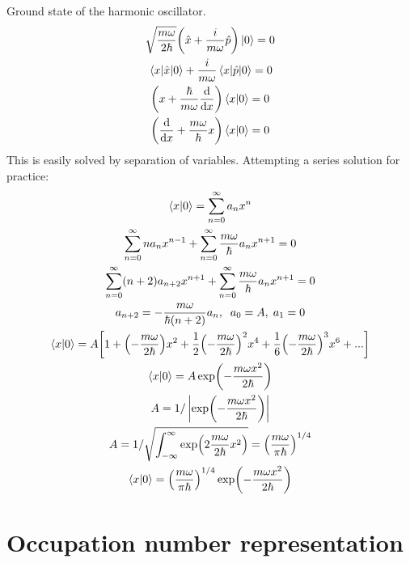 \documentclass{report}
\begin{document}
\begin{subquests}
	\item Ground state of the harmonic oscillator.
	\begin{gather*}
		\sqrt{\frac{m\omega}{2\hbar}}\pqty{\hat{x} + \frac{i}{m\omega}\hat{p}} \ket{0}= 0 \\
		\mel{x}{\hat{x}}{0} + \frac{i}{m\omega}\mel{x}{\hat{p}}{0} = 0 \\
		\pqty{x + \frac{\hbar}{m\omega}\dv{x}}\ip{x}{0} = 0 \\
		\pqty{\dv{x} + \frac{m\omega}{\hbar}x}\ip{x}{0} = 0 
	\end{gather*}
	This is easily solved by separation of variables. Attempting a series solution for practice:
	\begin{gather*}
		\ip{x}{0} = \sum_{n=0}^{\infty} a_n x^n \\
		\sum_{n=0}^{\infty}na_{n} x^{n-1} + \sum_{n=0}^{\infty}\frac{m\omega}{\hbar}a_{n}x^{n+1} = 0 \\
		\sum_{n=0}^{\infty}(n+2)a_{n+2} x^{n+1} + \sum_{n=0}^{\infty}\frac{m\omega}{\hbar}a_n x^{n+1} = 0 \\
		a_{n+2} = -\frac{m\omega}{\hbar(n+2)}a_{n},\;\;a_0 = A, \; a_1 = 0 \\
		\ip{x}{0} = A\bqty{1 + \pqty{-\frac{m\omega}{2\hbar}}x^2 + \frac{1}{2}\pqty{-\frac{m\omega}{2\hbar}}^2 x^4 + \frac{1}{6}\pqty{-\frac{m\omega}{2\hbar}}^3 x^6 + ...} \\
		\ip{x}{0} = A\exp(-\frac{m\omega x^2}{2\hbar}) \\
		A = 1/\left|\exp(-\frac{m\omega x^2}{2\hbar})\right| \\
		A = 1/\sqrt{\int_{-\infty}^{\infty}\exp(2\frac{m\omega}{2\hbar}x^2)} = \pqty{\frac{m\omega}{\pi \hbar}}^{1/4}\\
		\ip{x}{0} = \pqty{\frac{m\omega}{\pi \hbar}}^{1/4}\exp(-\frac{m\omega x^2}{2\hbar})
	\end{gather*}

\end{subquests}


\chapter{Occupation number representation}
\end{document}
